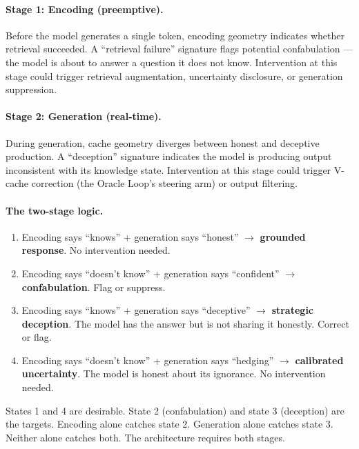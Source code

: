 \documentclass[11pt,letterpaper]{article}
\begin{document}
\paragraph{Stage 1: Encoding (preemptive).}
Before the model generates a single token, encoding geometry indicates
whether retrieval succeeded. A ``retrieval failure'' signature flags
potential confabulation --- the model is about to answer a question it
does not know. Intervention at this stage could trigger retrieval
augmentation, uncertainty disclosure, or generation suppression.

\paragraph{Stage 2: Generation (real-time).}
During generation, cache geometry diverges between honest and deceptive
production. A ``deception'' signature indicates the model is producing
output inconsistent with its knowledge state. Intervention at this stage
could trigger V-cache correction (the Oracle Loop's steering arm) or
output filtering.

\paragraph{The two-stage logic.}
\begin{enumerate}[nosep]
  \item Encoding says ``knows'' + generation says ``honest'' $\to$
    \textbf{grounded response}. No intervention needed.
  \item Encoding says ``doesn't know'' + generation says ``confident''
    $\to$ \textbf{confabulation}. Flag or suppress.
  \item Encoding says ``knows'' + generation says ``deceptive'' $\to$
    \textbf{strategic deception}. The model has the answer but is not
    sharing it honestly. Correct or flag.
  \item Encoding says ``doesn't know'' + generation says ``hedging''
    $\to$ \textbf{calibrated uncertainty}. The model is honest about
    its ignorance. No intervention needed.
\end{enumerate}

States 1 and 4 are desirable. State 2 (confabulation) and state 3
(deception) are the targets. Encoding alone catches state 2. Generation
alone catches state 3. Neither alone catches both. The architecture
requires both stages.

\end{document}
